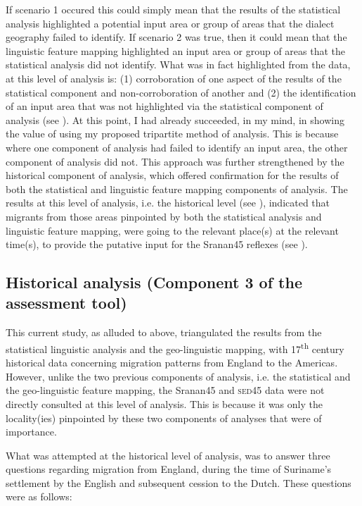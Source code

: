 {{{{{{{{{If scenario 1 occured this could simply mean that the results of the statistical analysis highlighted a potential input area or group of areas that the dialect geography failed to identify. If scenario 2 was true, then it could mean that the linguistic feature mapping highlighted an input area or group of areas that the statistical analysis did not identify. What was in fact highlighted from the data, at this level of analysis is: (1) corroboration of one aspect of the results of the statistical component and non-corroboration of another and (2) the identification of an input area that was not highlighted via the statistical component of analysis (see ). At this point, I had already succeeded, in my mind, in showing the value of using my proposed tripartite method of analysis. This is because where one component of analysis had failed to identify an input area, the other component of analysis did not. This approach was further strengthened by the historical component of analysis, which offered confirmation for the results of both the statistical and linguistic feature mapping components of analysis. The results at this level of analysis, i.e. the historical level (see ), indicated that migrants from those areas pinpointed by both the statistical analysis and linguistic feature mapping, were going to the relevant place(s) at the relevant time(s), to provide the putative input for the Sranan45 reflexes (see ).

\subsection{Historical analysis (Component 3 of the assessment tool)} \label{3.4.5}
This current study, as alluded to above, triangulated the results from the statistical linguistic analysis and the geo-linguistic mapping, with 17\textsuperscript{th} century historical data concerning migration patterns from England to the Americas. However, unlike the two previous components of analysis, i.e. the statistical and the geo-linguistic feature mapping, the Sranan45 and \textsc{sed45} data were not directly consulted at this level of analysis. This is because it was only the locality(ies) pinpointed by these two components of analyses that were of importance.

What was attempted at the historical level of analysis, was to answer three questions regarding migration from England, during the time of Suriname's settlement by the English and subsequent cession to the Dutch. These questions were as follows:

}}}}}}}}}

